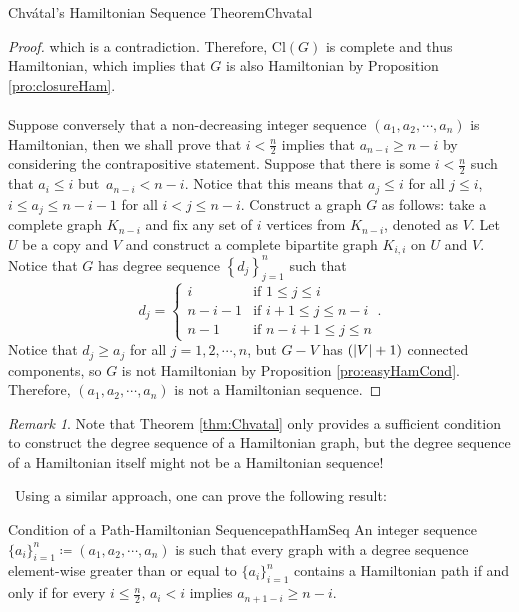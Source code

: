 \documentclass[math]{amznotes}
\theoremstyle{remark}
\newtheorem*{remark}{Remark}
\begin{document}
\begin{thmbox}{Chv\'{a}tal's Hamiltonian Sequence Theorem}{Chvatal}
\begin{proof}
        which is a contradiction. Therefore, $\mathrm{Cl}(G)$ is complete and thus Hamiltonian, which implies that $G$ is also Hamiltonian by Proposition \ref{pro:closureHam}.
        \\\\
        Suppose conversely that a non-decreasing integer sequence $(a_1, a_2, \cdots, a_n)$ is Hamiltonian, then we shall prove that $i < \frac{n}{2}$ implies that $a_{n - i} \geq n - i$ by considering the contrapositive statement. Suppose that there is some $i < \frac{n}{2}$ such that $a_i \leq i$ but~$a_{n - i} < n - i$. Notice that this means that $a_j \leq i$ for all $j \leq i$, $i \leq a_j \leq n - i - 1$ for all $i < j \leq n - i$. Construct a graph $G$ as follows: take a complete graph $K_{n - i}$ and fix any set of $i$ vertices from $K_{n - i}$, denoted as $V$. Let $U$ be a copy and $V$ and construct a complete bipartite graph $K_{i, i}$ on $U$ and $V$. Notice that $G$ has degree sequence $\left\{d_j\right\}_{j = 1}^{n}$ such that 
        \begin{equation*}
            d_j = \begin{cases}
                i & \textrm{if } 1 \leq j \leq i \\
                n - i - 1 & \textrm{if } i + 1 \leq j \leq n - i \\
                n - 1 & \textrm{if } n - i + 1 \leq j \leq n
            \end{cases}.
        \end{equation*}
        Notice that $d_j \geq a_j$ for all $j = 1, 2, \cdots, n$, but $G - V$ has $({\left\lvert {V} \right\rvert} + 1)$ connected components, so $G$ is not Hamiltonian by Proposition \ref{pro:easyHamCond}. Therefore, $(a_1, a_2, \cdots, a_n)$ is not a Hamiltonian sequence.
    \end{proof}
\end{thmbox}
\begin{notebox}
    \begin{remark}      
        Note that Theorem \ref{thm:Chvatal} only provides a sufficient condition to construct the degree sequence of a Hamiltonian graph, but the degree sequence of a Hamiltonian itself might not be a Hamiltonian sequence!  
    \end{remark}        
\end{notebox}\
Using a similar approach, one can prove the following result:
\begin{thmbox}{Condition of a Path-Hamiltonian Sequence}{pathHamSeq}
    An integer sequence $\{a_i\}_{i = 1}^n \coloneqq (a_1, a_2, \cdots, a_n)$ is such that every graph with a degree sequence element-wise greater than or equal to $\{a_i\}_{i = 1}^n$ contains a Hamiltonian path if and only if for every $i \leq \frac{n}{2}$, $a_i < i$ implies $a_{n + 1 - i} \geq n - i$.
\end{thmbox}
\end{document}
